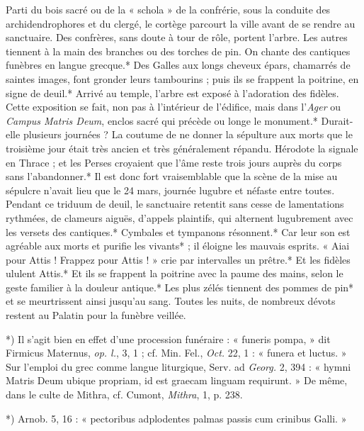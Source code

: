 \documentclass[a4paper, 11pt, oneside, polutonikogreek, french]{article}
\begin{document}
Parti du bois sacré ou de la « schola » de la confrérie, sous la conduite des archidendrophores et du clergé, le cortège parcourt la ville avant de se rendre au sanctuaire. Des confrères, sans doute à tour de rôle, portent l'arbre. Les autres tiennent à la main des branches ou des torches de pin. On chante des cantiques funèbres en langue grecque.* Des Galles aux longs cheveux épars, chamarrés de saintes images, font gronder leurs tambourins ; puis ils se frappent la poitrine, en signe de deuil.* Arrivé au temple, l'arbre est exposé à l'adoration des fidèles. Cette exposition se fait, non pas à l'intérieur de l'édifice, mais dans l'\emph{Ager} ou \emph{Campus Matris Deum}, enclos sacré qui précède ou longe le monument.* Durait-elle plusieurs journées ? La coutume de ne donner la sépulture aux morts que le troisième jour était très ancien et très généralement répandu. Hérodote la signale en Thrace ; et les Perses croyaient que l'âme reste trois jours auprès du corps sans l'abandonner.* Il est donc fort vraisemblable que la scène de la mise au sépulcre n'avait lieu que le 24 mars, journée lugubre et néfaste entre toutes. Pendant ce triduum de deuil, le sanctuaire retentit sans cesse de lamentations rythmées, de clameurs aiguës, d'appels plaintifs, qui alternent lugubrement avec les versets des cantiques.* Cymbales et tympanons résonnent.* Car leur son est agréable aux morts et purifie les vivants* ; il éloigne les mauvais esprits. « Aiai pour Attis ! Frappez pour Attis ! » crie par intervalles un prêtre.* Et les fidèles ululent Attis.* Et ils se frappent la poitrine avec la paume des mains, selon le geste familier à la douleur antique.* Les plus zélés tiennent des pommes de pin* et se meurtrissent ainsi jusqu'au sang. Toutes les nuits, de nombreux dévots restent au Palatin pour la funèbre veillée.

*) Il s'agit bien en effet d'une procession funéraire : « funeris pompa, » dit Firmicus Maternus, \emph{op. l.}, 3, 1 ; cf. Min. Fel., \emph{Oct.} 22, 1 : « funera et luctus. » Sur l'emploi du grec comme langue liturgique, Serv. ad \emph{Georg.} 2, 394 : « hymni Matris Deum ubique propriam, id est graecam linguam requirunt. » De même, dans le culte de Mithra, cf. Cumont, \emph{Mithra}, 1, p. 238.

*) Arnob. 5, 16 : « pectoribus adplodentes palmas passis cum crinibus Galli. »
\end{document}
